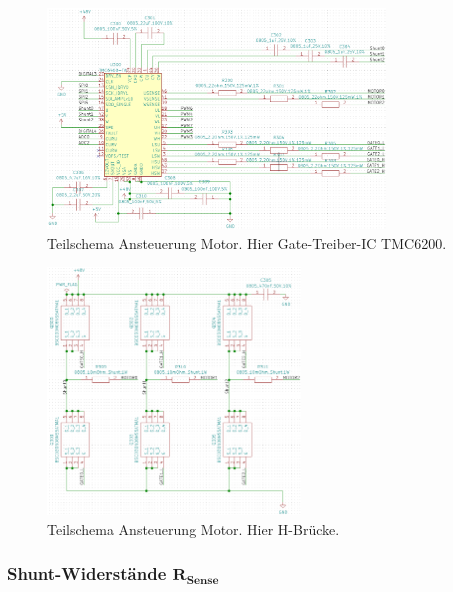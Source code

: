 \begin{figure}[h!]
	\centering
	\includegraphics[width=0.8\textwidth]{graphics/TMC6200_Schema.png}
	\caption{Teilschema Ansteuerung Motor. Hier Gate-Treiber-IC TMC6200.}
	\label{fig:Schema_TMC6200}
\end{figure}
\begin{figure}[h!]
	\centering
	\includegraphics[width=0.6\textwidth]{graphics/H_Bruecke_Schema.png}
	\caption{Teilschema Ansteuerung Motor. Hier H-Brücke.}
	\label{fig:Schema_TMC6200}
\end{figure}

\newpage
\subsubsection{Shunt-Widerstände $\mathrm{\mathbf{R_{Sense}}}$}\label{subsubsec:Shuntwiderstaende_TMC6200}

